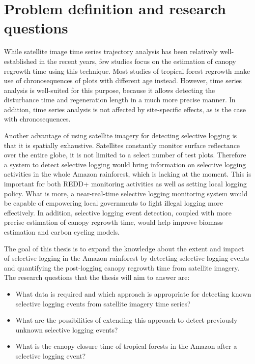 \documentclass[a4paper,10pt]{article}
\begin{document}
\section{Problem definition and research questions}

While satellite image time series trajectory analysis has been relatively well-established in the recent years, few studies focus on the estimation of canopy regrowth time using this technique. Most studies of tropical forest regrowth make use of chronosequences of plots with different age instead. However, time series analysis is well-suited for this purpose, because it allows detecting the disturbance time and regeneration length in a much more precise manner. In addition, time series analysis is not affected by site-specific effects, as is the case with chronosequences.

Another advantage of using satellite imagery for detecting selective logging is that it is spatially exhaustive. Satellites constantly monitor surface reflectance over the entire globe, it is not limited to a select number of test plots. Therefore a system to detect selective logging would bring information on selective logging activities in the whole Amazon rainforest, which is lacking at the moment. This is important for both \ac{REDD+} monitoring activities as well as setting local logging policy. What is more, a near-real-time selective logging monitoring system would be capable of empowering local governments to fight illegal logging more effectively. In addition, selective logging event detection, coupled with more precise estimation of canopy regrowth time, would help improve biomass estimation and carbon cycling models.

The goal of this thesis is to expand the knowledge about the extent and impact of selective logging in the Amazon rainforest by detecting selective logging events and quantifying the post-logging canopy regrowth time from satellite imagery. The research questions that the thesis will aim to answer are:

\begin{itemize}
 \item What data is required and which approach is appropriate for detecting known selective logging events from satellite imagery time series?
 \item What are the possibilities of extending this approach to detect previously unknown selective logging events?
 \item What is the canopy closure time of tropical forests in the Amazon after a selective logging event?
\end{itemize}
\end{document}
